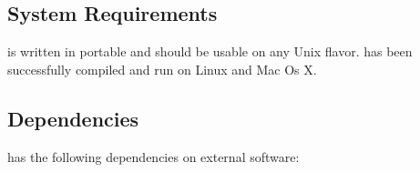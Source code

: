 
\subsection{System Requirements}

\MACI is written in portable \CPP and should be usable on any Unix flavor. \MACI has been successfully compiled and run on Linux and Mac Os X.

\subsection{Dependencies}

\MACI has the following dependencies on external software:

\begin{center}
\tabletail{%
\hline
}


\end{center}
